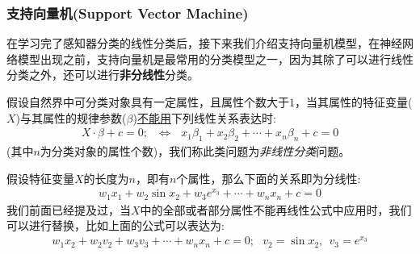 \documentclass[12pt]{article}
\numberwithin{figure}{section}
\numberwithin{equation}{section}
\begin{document}
\subsubsection{支持向量机(Support Vector Machine)}

在学习完了感知器分类的线性分类后，接下来我们介绍支持向量机模型，在神经网络模型出现之前，支持向量机是最常用的分类模型之一，因为其除了可以进行线性分类之外，还可以进行\textbf{非分线性}分类。

\begin{definition}
假设自然界中可分类对象具有一定属性，且属性个数大于$1$，当其属性的特征变量($X$)与其属性的规律参数($\beta$)\underline{不能用}下列线性关系表达时:
	\begin{align*}
		X \cdot \beta + c  =0 ; \ \ \ \Leftrightarrow \ \ \ x_1\beta_1 + x_2 \beta_2 + \cdots + x_n \beta_n + c = 0
	\end{align*}
	(其中$n$为分类对象的属性个数)，我们称此类问题为\textit{非线性分类}问题。
\end{definition}

\begin{remark}
	假设特征变量$X$的长度为$n$，即有$n$个属性，那么下面的关系即为分线性:
	\begin{align*}
		w_1 x_1  + w_2 \sin x_2 + w_3 e^{x_3} + \cdots + w_n x_n + c = 0 
	\end{align*}	
	我们前面已经提及过，当$X$中的全部或者部分属性不能再线性公式中应用时，我们可以进行替换，比如上面的公式可以表达为:
	\begin{align*}
		w_1 x_2 + w_2 v_2 + w_3 v_3 + \cdots + w_n x_n + c = 0; \ \ \ v_2 = \sin x_2, \ \ v_3 = e^{x_3} 
	\end{align*}
\end{remark}
\end{document}
